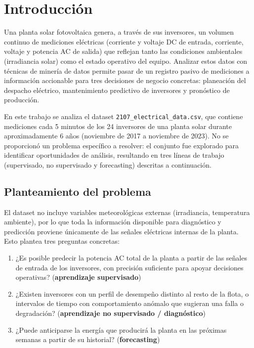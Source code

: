 \section{Introducción}

Una planta solar fotovoltaica genera, a través de sus inversores, un volumen continuo de mediciones eléctricas (corriente y voltaje DC de entrada, corriente, voltaje y potencia AC de salida) que reflejan tanto las condiciones ambientales (irradiancia solar) como el estado operativo del equipo. Analizar estos datos con técnicas de minería de datos permite pasar de un registro pasivo de mediciones a información accionable para tres decisiones de negocio concretas: planeación del despacho eléctrico, mantenimiento predictivo de inversores y pronóstico de producción.

En este trabajo se analiza el dataset \texttt{2107\_electrical\_data.csv}, que contiene mediciones cada 5 minutos de los 24 inversores de una planta solar durante aproximadamente 6 años (noviembre de 2017 a noviembre de 2023). No se proporcionó un problema específico a resolver: el conjunto fue explorado para identificar oportunidades de análisis, resultando en tres líneas de trabajo (supervisado, no supervisado y forecasting) descritas a continuación.

\subsection*{Planteamiento del problema}

El dataset no incluye variables meteorológicas externas (irradiancia, temperatura ambiente), por lo que toda la información disponible para diagnóstico y predicción proviene únicamente de las señales eléctricas internas de la planta. Esto plantea tres preguntas concretas:

\begin{enumerate}
    \item ¿Es posible predecir la potencia AC total de la planta a partir de las señales de entrada de los inversores, con precisión suficiente para apoyar decisiones operativas? (\textbf{aprendizaje supervisado})
    \item ¿Existen inversores con un perfil de desempeño distinto al resto de la flota, o intervalos de tiempo con comportamiento anómalo que sugieran una falla o degradación? (\textbf{aprendizaje no supervisado / diagnóstico})
    \item ¿Puede anticiparse la energía que producirá la planta en las próximas semanas a partir de su historial? (\textbf{forecasting})
\end{enumerate}

